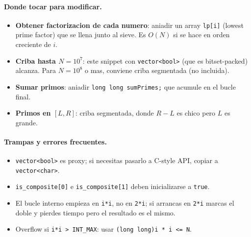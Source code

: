 \paragraph{Donde tocar para modificar.}
\begin{itemize}\setlength\itemsep{0pt}
	\item \textbf{Obtener factorizacion de cada numero}: aniadir un array \texttt{lp[i]} (lowest prime factor) que se llena junto al sieve. Es $O(N)$ si se hace en orden creciente de $i$.
	\item \textbf{Criba hasta $N = 10^7$}: este snippet con \texttt{vector<bool>} (que es bitset-packed) alcanza. Para $N = 10^8$ o mas, conviene criba segmentada (no incluida).
	\item \textbf{Sumar primos}: aniadir \texttt{long long sumPrimes;} que acumule en el bucle final.
	\item \textbf{Primos en $[L, R]$}: criba segmentada, donde $R - L$ es chico pero $L$ es grande.
\end{itemize}

\paragraph{Trampas y errores frecuentes.}
\begin{itemize}\setlength\itemsep{0pt}
	\item \texttt{vector<bool>} es proxy; si necesitas pasarlo a C-style API, copiar a \texttt{vector<char>}.
	\item \texttt{is\_composite[0]} e \texttt{is\_composite[1]} deben inicializarse a \texttt{true}.
	\item El bucle interno empieza en \texttt{i*i}, no en \texttt{2*i}; si arrancas en \texttt{2*i} marcas el doble y pierdes tiempo pero el resultado es el mismo.
	\item Overflow si \texttt{i*i > INT\_MAX}: usar \texttt{(long long)i * i <= N}.
\end{itemize}

